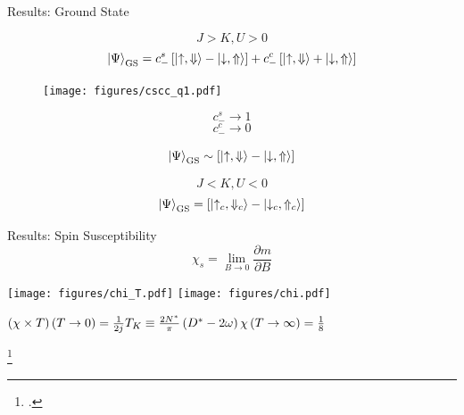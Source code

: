 \documentclass[aspectratio=169]{beamer}
\begin{document}
\begin{frame}[noframenumbering]{Results: Ground State}
\begin{minipage}{0.65\textwidth}
	\[J > K, U>0\]
\vspace*{-10pt}
	\[\ket{\Psi}_\text{GS} = c_-^s\left[\ket{\uparrow, \Downarrow} - \ket{\downarrow, \Uparrow}\right] + c_-^c\left[\ket{\uparrow, \Downarrow} + \ket{\downarrow, \Uparrow}\right]\]

\vspace*{10pt}
\begin{minipage}{0.65\textwidth}
\begin{figure}[htpb]
	\centering
	\texttt{[image: figures/cscc\_q1.pdf]}
\end{figure}
\end{minipage}
\begin{minipage}{0.3\textwidth}
	\[ c_-^s \to 1\]
	\[ c_-^c \to 0\]
\end{minipage}
\[\ket{\Psi}_\text{GS} \sim \left[\ket{\uparrow, \Downarrow} - \ket{\downarrow, \Uparrow}\right]\]
\end{minipage}
\vline
\begin{minipage}{0.34\textwidth}
\[J < K, U<0\]
\[\ket{\Psi}_\text{GS} = \left[\ket{\uparrow_c, \Downarrow_c} - \ket{\downarrow_c, \Uparrow_c}\right]\]
\vspace*{0.6\textheight}
\end{minipage}
\end{frame}

\begin{frame}[noframenumbering]{Results: Spin Susceptibility}
	\vspace*{-20pt}
	\[\chi_s = \lim_{B \to 0} \frac{\partial{m}}{\partial{B}}\]
\begin{center}
	\hspace*{-20pt}
	\texttt{[image: figures/chi\_T.pdf]}
	\hspace*{25pt}
	\texttt{[image: figures/chi.pdf]}
\end{center}
\hspace*{20pt}\large{\(
\left(\chi\times T\right)\left( T \to 0 \right) = \frac{1}{2j} \hspace*{\fill} T_K \equiv \frac{2N^*}{\pi}\left(D^* - 2\omega\right)\hspace*{\fill} \chi \left( T \to \infty \right) = \frac{1}{8}\)}

\footcite{wilson, hrk-nrg}
\end{frame}
\end{document}
